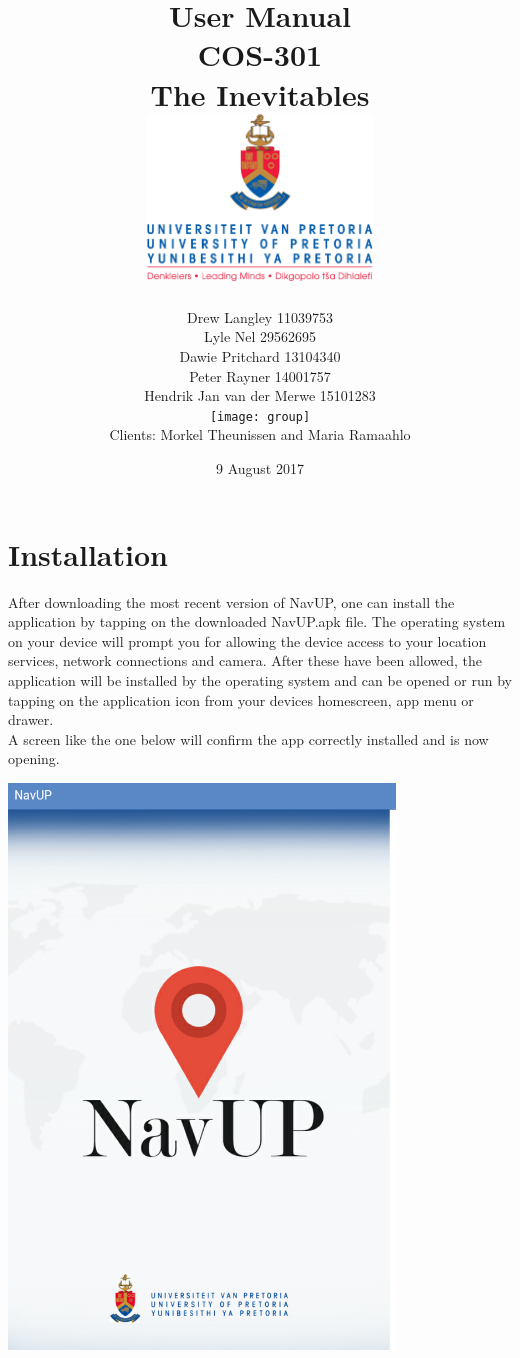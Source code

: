 \documentclass{article}
\title{ User Manual \\ COS-301 \\ The Inevitables \\[0.5cm] \includegraphics[width=6cm]{front-page}}
\author{Drew Langley \hfill 11039753 \\ Lyle Nel \hfill 29562695 \\ Dawie Pritchard \hfill 13104340 \\  Peter Rayner \hfill 14001757\\ Hendrik Jan van der Merwe \hfill 15101283 \\ [1cm]\texttt{[image: group]}\\ [1cm] Clients: Morkel Theunissen and Maria Ramaahlo }
\date{9 August 2017}
\begin{document}
\maketitle
\pagebreak
\tableofcontents
\pagebreak

\section{Installation}
	After downloading the most recent version of NavUP, one can install the application by tapping on the downloaded NavUP.apk file. The operating system on your device will prompt you for allowing the device access to your location services, network connections and camera. After these have been allowed, the application will be installed by the operating system and can be opened or run by tapping on the application icon from your devices homescreen, app menu or drawer.
	\\
	A screen like the one below will confirm the app correctly installed and is now opening.
	\\
	\par

	\includegraphics[height=15cm]{front-splash.png}
	
\end{document}
